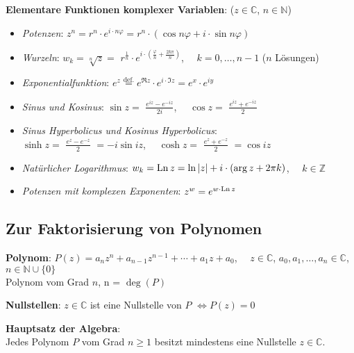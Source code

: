 \textbf{Elementare Funktionen komplexer Variablen}:
($z \in \mathbb{C}$, $n \in \mathbb{N}$)
\begin{itemize}
    \item \emph{Potenzen}: $z^n = r^n \cdot e^{i \cdot n\varphi} =
    r^n \cdot (\cos{n \varphi} + i \cdot \sin{n \varphi})$
    
    \item \emph{Wurzeln}: $w_k = \sqrt[n]{z} =$
    {\Large $r^{\frac{1}{n}} \cdot
    e^{i \cdot (\frac{\varphi}{n} + \frac{2k\pi}{n})}$},
    $\quad k = 0, \ldots, n-1$ ($n$ Lösungen)
    
    \item \emph{Exponentialfunktion}: $e^z \overset{\text{def.}}{=}
    e^{\Re{z}} \cdot e^{i \cdot \Im{z}} =
    e^x \cdot e^{iy}$
    
    \item \emph{Sinus und Kosinus}:
    $\sin{z} =$ {\Large $\frac{e^{iz} - e^{-iz}}{2i}$},
    $\quad \cos{z} =$ {\Large $\frac{e^{iz} + e^{-iz}}{2}$}
    
    \item \emph{Sinus Hyperbolicus und Kosinus Hyperbolicus}: \\
    $\sinh{z} =$ {\Large $\frac{e^{z} - e^{-z}}{2}$} $= -i \sin{iz}$,
    $\quad \cosh{z} =$ {\Large $\frac{e^{z} + e^{-z}}{2}$} $= \cos{iz}$
    
    \item \emph{Natürlicher Logarithmus}: $w_k = \operatorname{Ln}{z} =
    \ln{|z|} + i \cdot (\arg{z} + 2 \pi k)$, $\quad k \in \mathbb{Z}$
    
    \item \emph{Potenzen mit komplexen Exponenten}: $z^w = e^{w \cdot \operatorname{Ln}{z}}$
\end{itemize}

\pagebreak

\subsection{%
    Zur Faktorisierung von Polynomen%
}

\textbf{Polynom}: $P(z) = a_n z^n + a_{n-1} z^{n-1} + \cdots + a_1 z + a_0$,
$\quad z \in \mathbb{C}$, $a_0, a_1, \ldots, a_n \in \mathbb{C}$,
$n \in \mathbb{N} \cup \{0\}$ \\
Polynom vom Grad $n$, n = $\deg(P)$

\textbf{Nullstellen}: $z \in \mathbb{C}$ ist eine Nullstelle von $P$
$\Leftrightarrow P(z) = 0$

\textbf{Hauptsatz der Algebra}: \\
Jedes Polynom $P$ vom Grad $n \ge 1$ besitzt
mindestens eine Nullstelle $z \in \mathbb{C}$.

